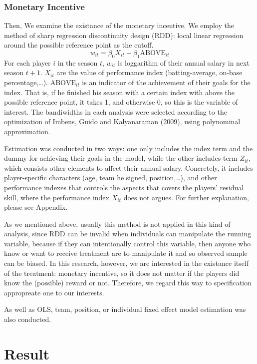 \documentclass[dvipdfmx, 12pt]{article}
\begin{document}
  \subsubsection{Monetary Incentive}

  Then, We examine the existance of the monetary incentive. We employ the method of sharp regression discontinuity design (RDD): local linear regression around the possible reference point as the cutoff.
  \[
  w_{it} = \beta_0 X_{it} + \beta_1 \text{ABOVE}_{it}
  \]
  For each player $i$ in the season $t$, $w_{it}$ is loggarithm of their annual salary in next season $t+1$. $X_{it}$ are the value of performance index (batting-average, on-base percentage,\ldots). $\text{ABOVE}_{it}$ is an indicator of the achievement of their goals for the index. That is, if he finished his season with a certain index with above the possible reference point, it takes 1, and otherwise 0, so this is the variable of interest. The bandiwidths in each analysis were selected according to the optimization of Imbens, Guido and Kalyanaraman (2009), using polynominal approximation.

  Estimation was conducted in two ways: one only includes the index term and the dummy for achieving their goals in the model, while the other includes term $Z_{it}$, which consists other elements to affect their annual salary. Concretely, it includes player-specific characters (age, team he signed, position,\ldots), and other performance indexes that controls the aspects that covers the players' residual skill, where the performance index $X_{it}$ does not argues. For further explanation, please see Appendix.

  As we mentioned above, usually this method is not applied in this kind of analysis, since RDD can be invalid when individuals can manipulate the running variable, because if they can intentionally control this variable, then anyone who know or want to receive treatment are to manipulate it and so observed sample can be biased. In this research, however, we are interested in the existance itself of the treatment: monetary incentive, so it does not matter if the players did know the (possible) reward or not. Therefore, we regard this way to specification appropreate one to our interests.

  As well as OLS, team, position, or individual fixed effect model estimation was also conducted.


\section{Result}
\end{document}
